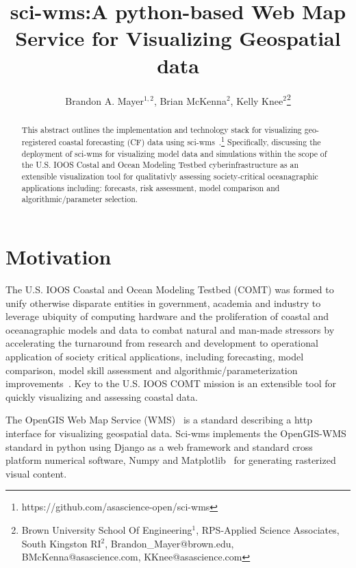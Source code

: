\documentclass[11pt,twocolumn,twoside]{IEEEtran}
\begin{document}
\title{\vspace{0.2in}\sc sci-wms:A python-based Web Map Service for Visualizing Geospatial data}

\author{Brandon A. Mayer$^{1,2}$, Brian McKenna$^{2}$, Kelly Knee$^{2}$\thanks{Brown University School Of Engineering$^{1}$, RPS-Applied Science Associates, South Kingston RI$^{2}$, Brandon\_Mayer@brown.edu, BMcKenna@asascience.com, KKnee@asascience.com}}

\maketitle
\thispagestyle{fancy}

\begin{abstract}
This abstract outlines the implementation and technology stack for
visualizing geo-registered coastal forecasting (CF) data using
sci-wms~\cite{wms14}.\footnote{https://github.com/asascience-open/sci-wms}
Specifically, discussing the deployment of sci-wms for visualizing
model data and simulations within the scope of the U.S. IOOS Costal
and Ocean Modeling Testbed cyberinfrastructure as an
extensible visualization tool for qualitativly assessing
society-critical oceanagraphic applications including: forecasts, risk
assessment, model comparison and algorithmic/parameter selection.~\cite{leuttich13}
\end{abstract}

\section{Motivation}
The U.S. IOOS Coastal and Ocean Modeling Testbed (COMT) was formed to
unify otherwise disparate entities in government, academia and
industry to leverage ubiquity of computing hardware and the
proliferation of coastal and oceanagraphic models and data to combat
natural and man-made stressors by accelerating the turnaround from
research and development to operational application of society
critical applications, including forecasting, model comparison, model
skill assessment and algorithmic/parameterization
improvements~\cite{luettich13}. Key to the U.S. IOOS COMT mission is
an extensible tool for quickly visualizing and assessing coastal data.

The OpenGIS Web Map Service (WMS)~\cite{wms14} is a standard
describing a http interface for visualizing geospatial data. Sci-wms
implements the OpenGIS-WMS standard in python using Django as a web
framework and standard cross platform numerical software, Numpy and
Matplotlib~\cite{numpy11, hunter07} for generating rasterized visual
content.
\end{document}
